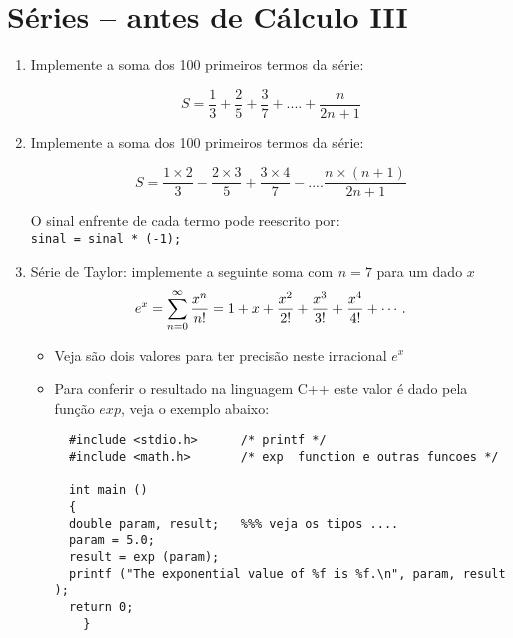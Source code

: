 \documentclass[12pt,a4paper]{article}
\begin{document}
\begin{center}
\end{center}


\section{Séries -- antes de Cálculo III}

\begin{enumerate}


\item Implemente a soma dos 100 primeiros termos da série:

$$
S = \frac{1}{3} + \frac{2}{5} + \frac{3}{7} +....  + \frac{n}{2n+1}
$$


\item Implemente a soma dos 100 primeiros termos da série:

$$
S = \frac{1\times 2}{3}-\frac{2\times 3}{5}+\frac{3\times 4}{7} -....  \frac{n\times (n+1)}{2n+1}
$$

O sinal enfrente de cada termo pode reescrito por:\\
 \texttt{sinal = sinal * (-1);}



  \item Série de Taylor: implemente a seguinte soma com  $n=7$ para um dado $x$
  $$e^x = \sum^\infty_{n=0} {x^n\over n!} =1 + x + {x^2 \over 2!} + {x^3 \over 3!} + {x^4 \over 4!}+\cdots.$$
  \begin{itemize}
    \item Veja são dois valores para ter precisão neste irracional $e^x$
    \item Para conferir o resultado na linguagem C++ este valor é dado pela função $exp$, veja o 
    exemplo abaixo:
       
\begin{verbatim}
  #include <stdio.h>      /* printf */
  #include <math.h>       /* exp  function e outras funcoes */

  int main ()
  {
  double param, result;   %%% veja os tipos ....
  param = 5.0;
  result = exp (param);
  printf ("The exponential value of %f is %f.\n", param, result );
  return 0;
    }
\end{verbatim}
    

\end{itemize}
\end{enumerate}
\end{document}
